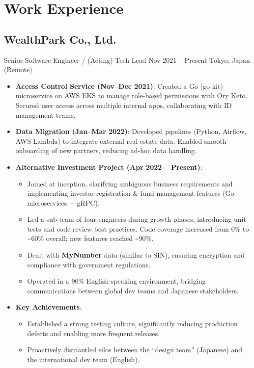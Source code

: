 \documentclass[11pt,a4paper]{moderncv}
\begin{document}
\section{Work Experience}

\subsection{WealthPark Co., Ltd.}
\cventry
    {Senior Software Engineer / (Acting) Tech Lead}
    {Nov 2021 -- Present}
    {Tokyo, Japan (Remote)}
    {}
    {
      \begin{itemize}
        \item \textbf{Access Control Service (Nov--Dec 2021)}:
        Created a Go (go-kit) microservice on AWS EKS to manage role-based permissions with Ory Keto.
        Secured user access across multiple internal apps, collaborating with ID management teams.
        \item \textbf{Data Migration (Jan--Mar 2022)}:
        Developed pipelines (Python, Airflow, AWS Lambda) to integrate external real estate data.
        Enabled smooth onboarding of new partners, reducing ad-hoc data handling.
        \item \textbf{Alternative Investment Project (Apr 2022 -- Present)}:
        \begin{itemize}
          \item Joined at inception, clarifying ambiguous business requirements and implementing investor registration \& fund management features (Go microservices + gRPC).
          \item Led a sub-team of four engineers during growth phases, introducing unit tests and code review best practices. Code coverage increased from 0\% to \textasciitilde60\% overall; new features reached \textasciitilde90\%.
          \item Dealt with \textbf{MyNumber} data (similar to SIN), ensuring encryption and compliance with government regulations.
          \item Operated in a 90\% English-speaking environment, bridging communications between global dev teams and Japanese stakeholders.
        \end{itemize}
        \item \textbf{Key Achievements}:
        \begin{itemize}
          \item Established a strong testing culture, significantly reducing production defects and enabling more frequent releases.
          \item Proactively dismantled silos between the “design team” (Japanese) and the international dev team (English).
        \end{itemize}
      \end{itemize}
    }
\end{document}
